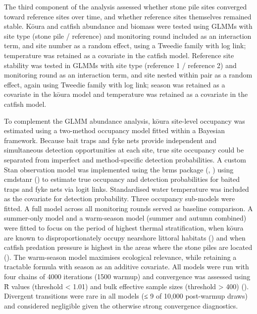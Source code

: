 \documentclass[
  letterpaper,
  DIV=11,
  numbers=noendperiod]{scrartcl}
\begin{document}
The third component of the analysis assessed whether stone pile sites
converged toward reference sites over time, and whether reference sites
themselves remained stable. Kōura and catfish abundance and biomass were
tested using GLMMs with site type (stone pile / reference) and
monitoring round included as an interaction term, and site number as a
random effect, using a Tweedie family with log link; temperature was
retained as a covariate in the catfish model. Reference site stability
was tested in GLMMs with site type (reference 1 / reference 2) and
monitoring round as an interaction term, and site nested within pair as
a random effect, again using Tweedie family with log link; season was
retained as a covariate in the kōura model and temperature was retained
as a covariate in the catfish model.

To complement the GLMM abundance analysis, kōura site-level occupancy
was estimated using a two-method occupancy model fitted within a
Bayesian framework. Because bait traps and fyke nets provide independent
and simultaneous detection opportunities at each site, true site
occupancy could be separated from imperfect and method-specific
detection probabilities. A custom Stan observation model was implemented
using the brms package (,
) using cmdstanr
() to estimate true occupancy
and detection probabilities for baited traps and fyke nets via logit
links. Standardised water temperature was included as the covariate for
detection probability. Three occupancy sub-models were fitted. A full
model across all monitoring rounds served as baseline comparison. A
summer-only model and a warm-season model (summer and autumn combined)
were fitted to focus on the period of highest thermal stratification,
when kōura are known to disproportionately occupy nearshore littoral
habitats () and when
catfish predation pressure is highest in the areas where the stone piles
are located ().
The warm-season model maximises ecological relevance, while retaining a
tractable formula with season as an additive covariate. All models were
run with four chains of 4000 iterations (1500 warmup) and convergence
was assessed using R̂ values (threshold \textless{} 1.01) and bulk
effective sample sizes (threshold \textgreater{} 400)
(). Divergent transitions
were rare in all models (≤ 9 of 10,000 post-warmup draws) and considered
negligible given the otherwise strong convergence diagnostics.
\end{document}

